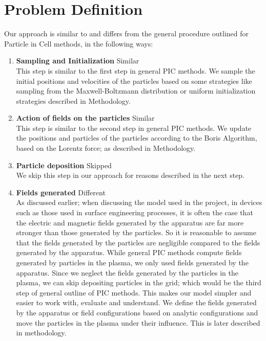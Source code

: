 \documentclass[12pt]{article}
\begin{document}
	\section{Problem Definition}
	Our approach is similar to and differs from the general procedure outlined for Particle in Cell methods, in the following ways:
	\begin{enumerate}
		\item \textbf{Sampling and Initialization} \hspace*{\fill}Similar \phantom{text} \\
		This step is similar to the first step in general PIC methods. We sample the initial positions and velocities of the particles based on some strategies like sampling from the Maxwell-Boltzmann distribution or uniform initialization strategies described in Methodology.
		\item \textbf{Action of fields on the particles} \hspace*{\fill}Similar \phantom{text}\\
		This step is similar to the second step in general PIC methods. We update the positions and particles of the particles according to the Boris Algorithm, based on the Lorentz force; as described in Methodology.
		\item \textbf{Particle deposition} \hspace*{\fill}Skipped \phantom{text}\\
		We skip this step in our approach for reasons described in the next step.
		\item \textbf{Fields generated} \hspace*{\fill}Different \phantom{text} \\
		As discussed earlier; when discussing the model used in the project, in devices such as those used in surface engineering processes, it is often the case that the electric and magnetic fields generated by the apparatus are far more stronger than those generated by the particles. So it is reasonable to assume that the fields generated by the particles are negligible compared to the fields generated by the apparatus. While general PIC methods compute fields generated by particles in the plasma, we only used fields generated by the apparatus. Since we neglect the fields generated by the particles in the plasma, we can skip depositing particles in the grid; which would be the third step of general outline of PIC methods. This makes our model simpler and easier to work with, evaluate and understand. We define the fields generated by the apparatus or field configurations based on analytic configurations and move the particles in the plasma under their influence. This is later described in methodology. 

\end{enumerate}
\end{document}
